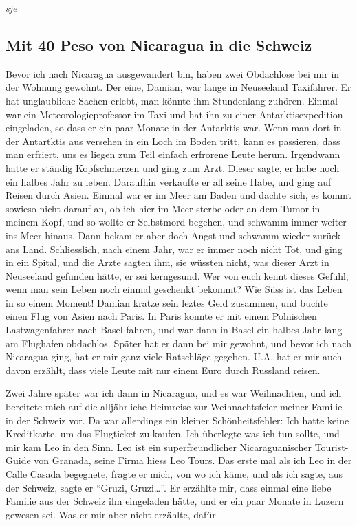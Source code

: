 \documentclass[
]{article}
\begin{document}
\emph{sje}

\hypertarget{mit-40-peso-von-nicaragua-in-die-schweiz}{%
\subsection{Mit 40 Peso von Nicaragua in die
Schweiz}\label{mit-40-peso-von-nicaragua-in-die-schweiz}}

Bevor ich nach Nicaragua ausgewandert bin, haben zwei Obdachlose bei mir
in der Wohnung gewohnt. Der eine, Damian, war lange in Neuseeland
Taxifahrer. Er hat unglaubliche Sachen erlebt, man könnte ihm
Stundenlang zuhören. Einmal war ein Meteorologieprofessor im Taxi und
hat ihn zu einer Antarktisexpedition eingeladen, so dass er ein paar
Monate in der Antarktis war. Wenn man dort in der Antartktis aus
versehen in ein Loch im Boden tritt, kann es passieren, dass man
erfriert, uns es liegen zum Teil einfach erfrorene Leute herum.
Irgendwann hatte er ständig Kopfschmerzen und ging zum Arzt. Dieser
sagte, er habe noch ein halbes Jahr zu leben. Daraufhin verkaufte er all
seine Habe, und ging auf Reisen durch Asien. Einmal war er im Meer am
Baden und dachte sich, es kommt sowieso nicht darauf an, ob ich hier im
Meer sterbe oder an dem Tumor in meinem Kopf, und so wollte er
Selbstmord begehen, und schwamm immer weiter ins Meer hinaus. Dann bekam
er aber doch Angst und schwamm wieder zurück ans Land. Schliesslich,
nach einem Jahr, war er immer noch nicht Tot, und ging in ein Spital,
und die Ärzte sagten ihm, sie wüssten nicht, was dieser Arzt in
Neuseeland gefunden hätte, er sei kerngesund. Wer von euch kennt dieses
Gefühl, wenn man sein Leben noch einmal geschenkt bekommt? Wie Süss ist
das Leben in so einem Moment! Damian kratze sein leztes Geld zusammen,
und buchte einen Flug von Asien nach Paris. In Paris konnte er mit einem
Polnischen Lastwagenfahrer nach Basel fahren, und war dann in Basel ein
halbes Jahr lang am Flughafen obdachlos. Später hat er dann bei mir
gewohnt, und bevor ich nach Nicaragua ging, hat er mir ganz viele
Ratschläge gegeben. U.A. hat er mir auch davon erzählt, dass viele Leute
mit nur einem Euro durch Russland reisen.

Zwei Jahre später war ich dann in Nicaragua, und es war Weihnachten, und
ich bereitete mich auf die alljährliche Heimreise zur Weihnachtsfeier
meiner Familie in der Schweiz vor. Da war allerdings ein kleiner
Schönheitsfehler: Ich hatte keine Kreditkarte, um das Flugticket zu
kaufen. Ich überlegte was ich tun sollte, und mir kam Leo in den Sinn.
Leo ist ein superfreundlicher Nicaraguanischer Tourist-Guide von
Granada, seine Firma hiess Leo Tours. Das erste mal als ich Leo in der
Calle Casada begegnete, fragte er mich, von wo ich käme, und als ich
sagte, aus der Schweiz, sagte er ``Gruzi, Gruzi\ldots{}''. Er erzählte
mir, dass einmal eine liebe Familie aus der Schweiz ihn eingeladen
hätte, und er ein paar Monate in Luzern gewesen sei. Was er mir aber
nicht erzählte, dafür
\end{document}
